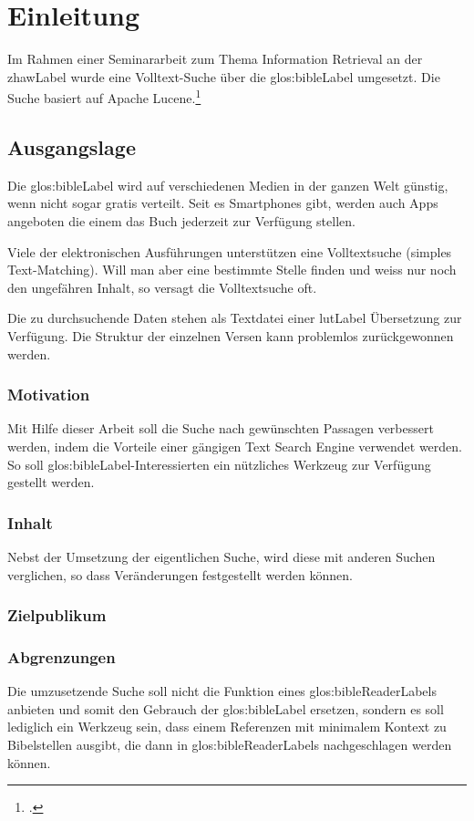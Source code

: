 \chapter{Einleitung}
Im Rahmen einer Seminararbeit zum Thema Information Retrieval an der \gls{zhawLabel} wurde eine Volltext-Suche über die \gls{glos:bibleLabel} umgesetzt. Die Suche basiert auf Apache Lucene.\footcite{Apache_Lucene_2016-05-07}

\section{Ausgangslage}
Die \gls{glos:bibleLabel} wird auf verschiedenen Medien in der ganzen Welt günstig, wenn nicht sogar gratis verteilt.
Seit es Smartphones gibt, werden auch Apps angeboten die einem das Buch jederzeit zur Verfügung stellen.

Viele der elektronischen Ausführungen unterstützen eine Volltextsuche (simples Text-Matching).
Will man aber eine bestimmte Stelle finden und weiss nur noch den ungefähren Inhalt, so versagt die Volltextsuche oft.

Die zu durchsuchende Daten stehen als Textdatei einer \gls{lutLabel} Übersetzung zur Verfügung. Die Struktur der einzelnen Versen kann problemlos zurückgewonnen werden.

\subsection{Motivation}
Mit Hilfe dieser Arbeit soll die Suche nach gewünschten Passagen verbessert werden, indem die Vorteile einer gängigen Text Search Engine verwendet werden.
So soll \gls{glos:bibleLabel}-Interessierten ein nützliches Werkzeug zur Verfügung gestellt werden.

\subsection{Inhalt}
Nebst der Umsetzung der eigentlichen Suche, wird diese mit anderen Suchen verglichen, so dass Veränderungen festgestellt werden können.

\subsection{Zielpublikum}

\subsection{Abgrenzungen}
Die umzusetzende Suche soll nicht die Funktion eines \gls{glos:bibleReaderLabel}s anbieten und somit den Gebrauch der \gls{glos:bibleLabel} ersetzen, sondern es soll lediglich ein Werkzeug sein, dass einem Referenzen mit minimalem Kontext zu Bibelstellen ausgibt, die dann in \glspl{glos:bibleReaderLabel} nachgeschlagen werden können.

